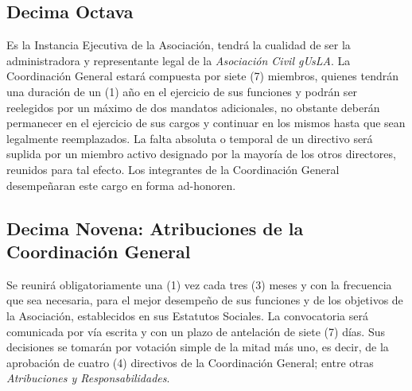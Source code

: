     \subsection{Decima Octava}

      Es la Instancia Ejecutiva de la Asociaci\'on, tendr\'a la cualidad de ser
      la administradora y representante legal de la \emph{Asociaci\'on Civil
      gUsLA}. La Coordinaci\'on General estar\'a compuesta por siete
      (7) miembros, quienes tendr\'an una duraci\'on de un (1) a\~no en el
      ejercicio de sus funciones y podr\'an ser reelegidos por un m\'aximo de
      dos mandatos adicionales, no obstante deber\'an permanecer en el ejercicio
      de sus cargos y continuar en los mismos hasta que sean legalmente
      reemplazados. La falta absoluta o temporal de un directivo ser\'a suplida
      por un miembro activo designado por la mayor\'i{}a de los otros
      directores, reunidos para tal efecto. Los integrantes de la Coordinaci\'on
      General desempe\~naran este cargo en forma ad-honoren.

    \subsection{Decima Novena: Atribuciones de la Coordinaci\'on General}

      Se reunir\'a obligatoriamente una (1) vez cada tres (3) meses y con la
      frecuencia que sea necesaria, para el mejor desempe\~no de sus funciones y
      de los objetivos de la Asociaci\'on, establecidos en sus Estatutos
      Sociales. La convocatoria ser\'a comunicada por v\'ia escrita y con un
      plazo de antelaci\'on de siete (7) d\'ias. Sus decisiones se tomar\'an por
      votaci\'on simple de la mitad m\'as uno, es decir, de la aprobaci\'on de
      cuatro (4) directivos de la Coordinaci\'on General; entre otras
      \emph{Atribuciones y Responsabilidades}.

